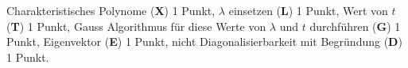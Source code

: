 \begin{bewertung}
Charakteristisches Polynome ({\bf X}) 1 Punkt,
$\lambda$ einsetzen ({\bf L}) 1 Punkt,
Wert von $t$ ({\bf T}) 1 Punkt,
Gauss Algorithmus für diese Werte von $\lambda$ und $t$ durchführen
({\bf G}) 1 Punkt,
Eigenvektor ({\bf E}) 1 Punkt,
nicht Diagonalisierbarkeit mit Begründung ({\bf D}) 1 Punkt.
\end{bewertung}



